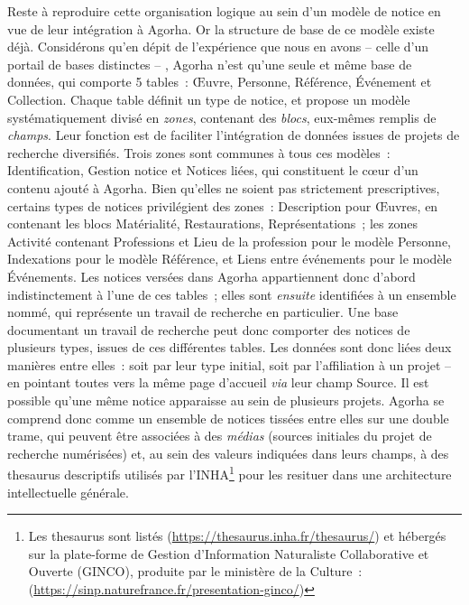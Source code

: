 \documentclass[a4paper,12pt, twoside]{book}
\begin{document}
Reste à reproduire cette organisation logique au sein d’un modèle de notice en vue de leur intégration à Agorha. Or la structure de base de ce modèle existe déjà. Considérons qu’en dépit de l’expérience que nous en avons -- celle d’un portail de bases distinctes -- , Agorha n’est qu’une seule et même base de données, qui comporte 5 tables~: \textsf{Œuvre, Personne, Référence, Événement} et \textsf{Collection}. Chaque table définit un type de notice, et propose un modèle systématiquement divisé en \textit{zones}, contenant des \textit{blocs}, eux-mêmes remplis de \textit{champs}. Leur fonction est de faciliter l’intégration de données issues de projets de recherche diversifiés. Trois zones sont communes à tous ces modèles~: \textsf{Identification, Gestion notice} et \textsf{Notices liées}, qui constituent le cœur d’un contenu ajouté à Agorha. Bien qu’elles ne soient pas strictement prescriptives, certains types de notices privilégient des zones~: \textsf{Description} pour \textsf{Œuvres}, en contenant les blocs \textsf{Matérialité, Restaurations, Représentations}~; les zones \textsf{Activité} contenant \textsf{Professions} et \textsf{Lieu de la profession} pour le modèle \textsf{Personne}, \textsf{Indexations} pour le modèle \textsf{Référence}, et \textsf{Liens entre événements} pour le modèle \textsf{Événements}. Les notices versées dans Agorha appartiennent donc d’abord indistinctement à l’une de ces tables~; elles sont \textit{ensuite} identifiées à un ensemble nommé, qui représente un travail de recherche en particulier. Une base documentant un travail de recherche peut donc comporter des notices de plusieurs types, issues de ces différentes tables. Les données sont donc liées deux manières entre elles~: soit par leur type initial, soit par l’affiliation à un projet – en pointant toutes vers la même page d’accueil \textit{via} leur champ \textsf{Source}. Il est possible qu’une même notice apparaisse au sein de plusieurs projets. Agorha se comprend donc comme un ensemble de notices tissées entre elles sur une double trame, qui peuvent être associées à des \textit{médias} (sources initiales du projet de recherche numérisées) et, au sein des valeurs indiquées dans leurs champs, à des thesaurus descriptifs utilisés par l’INHA\footnote{Les thesaurus sont listés (\url{https://thesaurus.inha.fr/thesaurus/}) et hébergés sur la plate-forme de Gestion d’Information Naturaliste Collaborative et Ouverte (GINCO), produite par le ministère de la Culture~:(\url{https://sinp.naturefrance.fr/presentation-ginco/})} pour les resituer dans une architecture intellectuelle générale.
\end{document}
